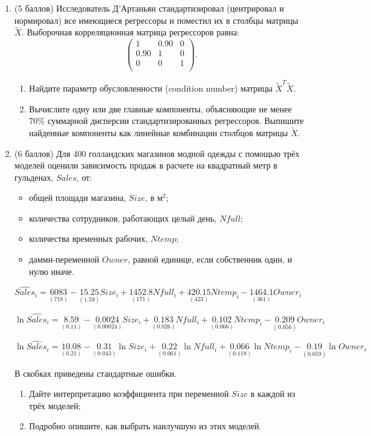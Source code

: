 \documentclass[12pt]{article}
\theoremstyle{definition}
\begin{document}
\begin{enumerate}
\item
(5 баллов)
Исследователь Д'Артаньян стандартизировал (центрировал и нормировал) все имеющиеся регрессоры и поместил их в столбцы матрицы $\tilde X$. Выборочная корреляционная матрица регрессоров равна:
\[
\begin{pmatrix}
1 & 0.90 & 0  \\
0.90 & 1 & 0  \\
0 & 0 & 1 \\
\end{pmatrix}.
\]
\begin{enumerate}
    \item Найдите параметр обусловленности (condition number) матрицы  $\tilde X^T \tilde X$.
    \item Вычислите одну или две главные компоненты, объясняющие не менее 70\% суммарной дисперсии стандартизированных регрессоров. Выпишите найденные компоненты как линейные комбинации столбцов матрицы $\tilde X$.
\end{enumerate}
\newpage

\item
(6 баллов)
Для 400 голландских магазинов модной одежды с помощью трёх моделей оценили зависимость продаж в расчете на квадратный метр в гульденах, $Sales$, от:
\begin{itemize}
\item общей площади магазина, $Size$, в м$^2$;
\item количества сотрудников, работающих целый день, $Nfull$;
\item количества временных рабочих, $Ntemp$;
\item дамми-переменной $Owner$, равной единице, если собственник один, и нулю иначе.
\end{itemize}

$\widehat{Sales}_i = \underset{(718)}{6083} - \underset{(1.59)}{15.25}Size_i + \underset{(171)}{1452.8} Nfull_i + \underset{(423)}{420.15} Ntemp_i - \underset{(361)}{1464.1} Owner_i$

$\ln \widehat{Sales}_i = \underset{(0.11)}{8.59} - \underset{(0.00024)}{0.0024}Size_i + \underset{(0.026)}{0.183} Nfull_i + \underset{(0.066)}{0.102} Ntemp_i - \underset{(0.056)}{0.209} Owner_i$

$\ln \widehat{Sales}_i = \underset{(0.21)}{10.08} - \underset{(0.043)}{0.31}\ln Size_i + \underset{(0.061)}{0.22} \ln Nfull_i + \underset{(0.118)}{0.066} \ln Ntemp_i - \underset{(0.059)}{0.19} \ln Owner_i$

В скобках приведены стандартные ошибки.

\begin{enumerate}
    \item Дайте интерпретацию коэффициента при переменной $Size$ в каждой из трёх моделей;
    \item Подробно опишите, как выбрать наилучшую из этих моделей.
\end{enumerate}

\end{enumerate}
\end{document}

